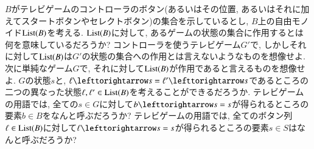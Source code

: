 \begin{exercise}
$B$がテレビゲームのコントローラのボタン(あるいはその位置, あるいはそれに加えてスタートボタンやセレクトボタン)の集合を示しているとし, $B$上の自由モノイド$\List(B)$を考える. 
\sexc $\List(B)$に対して, あるゲームの状態の集合に作用するとは何を意味しているだろうか? コントローラを使うテレビゲーム$G'$で, しかしそれに対して$\List(B)$は$G'$の状態の集合への作用とは言えないようなものを想像せよ. 次に単純なゲーム$G$で, それに対して$\List(B)$が作用であると言えるものを想像せよ.
\next $G$の状態$s$と, $\ell\acts s=\ell'\acts s$であるところの二つの異なった状態$\ell,\ell'\in\List(B)$を考えることができるだろうか. テレビゲームの用語では, 全ての$s\in G$に対して$b\acts s=s$が得られるところの要素$b\in B$をなんと呼ぶだろうか?
\next テレビゲームの用語では, 全てのボタン列$\ell\in\List(B)$に対して$\ell\acts s=s$が得られるところの要素$s\in S$はなんと呼ぶだろうか?
\endsexc
\end{exercise}

